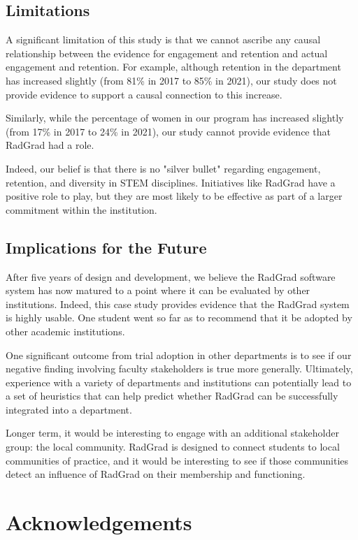\documentclass[acmsmall]{acmart}
\begin{document}
\subsection{Limitations}

A significant limitation of this study is that we cannot ascribe any causal relationship between the evidence for engagement and retention and actual engagement and retention. For example, although retention in the department has increased slightly (from 81\% in 2017 to 85\% in 2021), our study does not provide evidence to support a causal connection to this increase.

Similarly, while the percentage of women in our program has increased slightly (from 17\% in 2017 to 24\% in 2021), our study cannot provide evidence that RadGrad had a role.

Indeed, our belief is that there is no "silver bullet" regarding engagement, retention, and diversity in STEM disciplines. Initiatives like RadGrad have a positive role to play, but they are most likely to be effective as part of a larger commitment within the institution.

\subsection{Implications for the Future}

After five years of design and development, we believe the RadGrad software system has now matured to a point where it can be evaluated by other institutions. Indeed, this case study provides evidence that the RadGrad system is highly usable. One student went so far as to recommend that it be adopted by other academic institutions.

One significant outcome from trial adoption in other departments is to see if our negative finding involving faculty stakeholders is true more generally. Ultimately, experience with a variety of departments and institutions can potentially lead to a set of heuristics that can help predict whether RadGrad can be successfully integrated into a department.

Longer term, it would be interesting to engage with an additional stakeholder group: the local community. RadGrad is designed to connect students to local communities of practice, and it would be interesting to see if those communities detect an influence of RadGrad on their membership and functioning.

\section{Acknowledgements}
\end{document}
